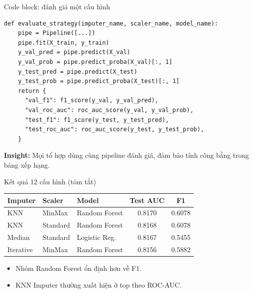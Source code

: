 \documentclass[10pt]{beamer}
\begin{document}
\begin{frame}[fragile]{Code block: đánh giá một cấu hình}
\begin{lstlisting}
def evaluate_strategy(imputer_name, scaler_name, model_name):
    pipe = Pipeline([...])
    pipe.fit(X_train, y_train)
    y_val_pred = pipe.predict(X_val)
    y_val_prob = pipe.predict_proba(X_val)[:, 1]
    y_test_pred = pipe.predict(X_test)
    y_test_prob = pipe.predict_proba(X_test)[:, 1]
    return {
      "val_f1": f1_score(y_val, y_val_pred),
      "val_roc_auc": roc_auc_score(y_val, y_val_prob),
      "test_f1": f1_score(y_test, y_test_pred),
      "test_roc_auc": roc_auc_score(y_test, y_test_prob),
    }
\end{lstlisting}
  \textbf{Insight:} Mọi tổ hợp dùng cùng pipeline đánh giá, đảm bảo tính công bằng trong bảng xếp hạng.
\end{frame}

\begin{frame}{Kết quả 12 cấu hình (tóm tắt)}
  \scriptsize
  \begin{table}
    \centering
    \begin{tabular}{lllcc}
      \toprule
      \textbf{Imputer} & \textbf{Scaler} & \textbf{Model} & \textbf{Test AUC} & \textbf{F1}\\
      \midrule
      KNN & MinMax & Random Forest & 0.8170 & 0.6078\\
      KNN & Standard & Random Forest & 0.8168 & 0.6078\\
      Median & Standard & Logistic Reg. & 0.8167 & 0.5455\\
      Iterative & MinMax & Random Forest & 0.8156 & 0.5882\\
      \bottomrule
    \end{tabular}
  \end{table}
  \vspace{0.3em}
  \begin{itemize}
    \item Nhóm Random Forest ổn định hơn về F1.
    \item KNN Imputer thường xuất hiện ở top theo ROC-AUC.
  \end{itemize}
\end{frame}
\end{document}
